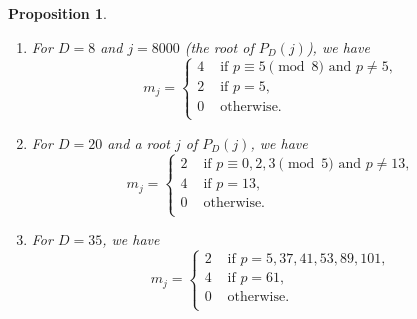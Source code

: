 \documentclass[10pt,a4paper]{amsart}
\newtheorem{prop}{Proposition}
\begin{document}
\begin{prop}
\label{GZmultiplicity}
\begin{enumerate}
\item[(1)] For $D=8$ and $j=8000$ (the root of $P_D(j)$),
we have
\[
m_j = \begin{cases}
4 & \text{ if } p \equiv 5 \pmod 8 \text{ and } p \ne 5,\\
2 & \text{ if } p = 5,\\
0 & \text{ otherwise. }\\
\end{cases}
\]
\item[(2)] For $D=20$ and a root $j$ of $P_D(j)$, we have
\[
m_j = \begin{cases}
2 & \text{ if } p \equiv 0, 2,3 \pmod 5 \text{ and } p\ne 13,\\
4 & \text{ if } p=13,\\
0 & \text{ otherwise.} \\
\end{cases}
\]
\item[(3)] For $D=35$, we have
\[
m_j = \begin{cases}
2 & \text{ if } p = 5, 37, 41, 53, 89, 101,\\
4 & \text{ if } p = 61,\\
0 & \text{ otherwise. }\\
\end{cases}
\]
\end{enumerate}
\end{prop}
\end{document}
